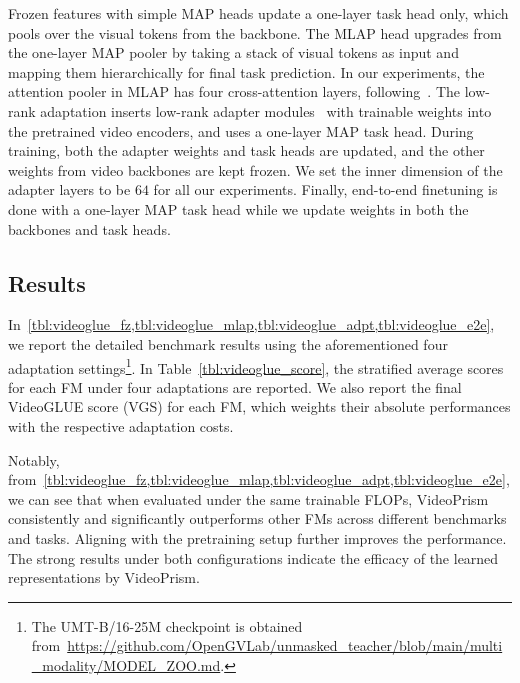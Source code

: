 \documentclass{article}
\theoremstyle{plain}
\theoremstyle{definition}
\theoremstyle{remark}
\newcommand{\OURS}{VideoPrism\xspace}
\begin{document}
Frozen features with simple MAP heads update a one-layer task head only, which pools over the visual tokens from the backbone.
The MLAP head upgrades from the one-layer MAP pooler by taking a stack of visual tokens as input and mapping them hierarchically for final task prediction. 
In our experiments, the attention pooler in MLAP has four cross-attention layers, following~\citet{yuan2023videoglue}.
The low-rank adaptation inserts low-rank adapter modules~\cite{hu2021lora} with trainable weights into the pretrained video encoders, and uses a one-layer MAP task head. 
During training, both the adapter weights and task heads are updated, and the other weights from video backbones are kept frozen.
We set the inner dimension of the adapter layers to be $64$ for all our experiments.
Finally, end-to-end finetuning is done with a one-layer MAP task head while we update weights in both the backbones and task heads.

\subsection{Results}
\label{app:videoglue:benchmark}

In~\cref{tbl:videoglue_fz,tbl:videoglue_mlap,tbl:videoglue_adpt,tbl:videoglue_e2e}, we report the detailed benchmark results using the aforementioned four adaptation settings\footnote{The UMT-B/16-25M checkpoint is obtained from~\url{https://github.com/OpenGVLab/unmasked_teacher/blob/main/multi_modality/MODEL_ZOO.md}.}.
In Table~\ref{tbl:videoglue_score}, the stratified average scores for each FM under four adaptations are reported. We also report the final VideoGLUE score (VGS) for each FM, which weights their absolute performances with the respective adaptation costs.

Notably, from~\cref{tbl:videoglue_fz,tbl:videoglue_mlap,tbl:videoglue_adpt,tbl:videoglue_e2e}, we can see that when evaluated under the same trainable FLOPs, \OURS consistently and significantly outperforms other FMs across different benchmarks and tasks.
Aligning with the pretraining setup further improves the performance.
The strong results under both configurations indicate the efficacy of the learned representations by \OURS.
\end{document}
